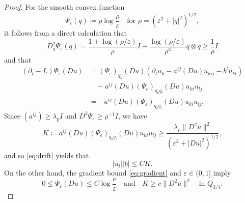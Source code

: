 \documentclass[10pt,a4paper]{amsart}
\begin{document}
\begin{proof}
For the smooth convex function
\begin{equation*}
\Psi_\varepsilon(q)\coloneqq\rho\log\frac\rho\varepsilon \quad \text{for $\rho=(\varepsilon^2+|q|^2)^{1/2}$},
\end{equation*}
it follows from a direct calculation that
\begin{equation*}
    D^2_q\Psi_{\varepsilon}(q)=\frac{1+\log(\rho/\varepsilon)}{\rho}I-\frac{\log(\rho/\varepsilon)}{\rho^3}q \otimes q \geq \frac{1}{\rho}I
\end{equation*}
and that
\begin{equation*}
    \begin{aligned}
        (\partial_t-L)\Psi_\varepsilon(Du)&=(\Psi_{\varepsilon})_{q_k}(Du) (\partial_t u_k-a^{ij}(Du)u_{kij}-b^lu_{kl}) \\
        &\quad-a^{ij}(Du)(\Psi_\varepsilon)_{q_kq_l}(Du)u_{ki}u_{lj}\\
        &=-a^{ij}(Du)(\Psi_\varepsilon)_{q_kq_l}(Du)u_{ki}u_{lj}.
    \end{aligned}
\end{equation*}
Since $(a^{ij}) \geq \lambda_pI$ and $D^2\Psi_{\varepsilon} \geq \rho^{-1}I$, we have
\begin{equation*}   
        K \coloneqq a^{ij}(Du)(\Psi_\varepsilon)_{q_kq_l}(Du)u_{ki}u_{lj}\geq\frac{\lambda_p\|D^2u\|^2}{(\varepsilon^2+|Du|^2)^{1/2}},
\end{equation*}
and so \eqref{eq:drift} yields that
\begin{equation}\label{eq:absorb}
 |u_t||b|\leq CK.
\end{equation}
On the other hand, the gradient bound \eqref{eq:gradient} and $\varepsilon \in (0,1]$ imply
\begin{equation*}
     0\leq\Psi_\varepsilon(Du)\leq C\log\frac e\varepsilon \quad \text{and} \quad 
     K\geq c\|D^2u\|^2 \quad\text{in $Q_{3/4}$}.
\end{equation*}


\end{proof}
\end{document}
